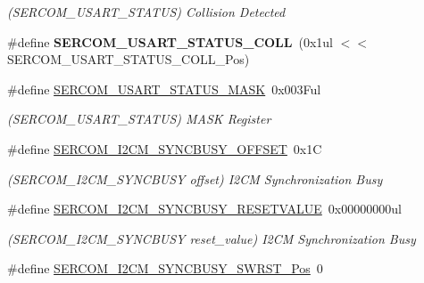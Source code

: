 \begin{DoxyCompactItemize}
\begin{DoxyCompactList}\small\item\em (S\+E\+R\+C\+O\+M\+\_\+\+U\+S\+A\+R\+T\+\_\+\+S\+T\+A\+T\+U\+S) Collision Detected \end{DoxyCompactList}\item 
\hypertarget{group___s_a_m_l21___s_e_r_c_o_m_gaa44fd322c8b2ce56480d8405b502d199}{}\#define {\bfseries S\+E\+R\+C\+O\+M\+\_\+\+U\+S\+A\+R\+T\+\_\+\+S\+T\+A\+T\+U\+S\+\_\+\+C\+O\+L\+L}~(0x1ul $<$$<$ S\+E\+R\+C\+O\+M\+\_\+\+U\+S\+A\+R\+T\+\_\+\+S\+T\+A\+T\+U\+S\+\_\+\+C\+O\+L\+L\+\_\+\+Pos)\label{group___s_a_m_l21___s_e_r_c_o_m_gaa44fd322c8b2ce56480d8405b502d199}

\item 
\hypertarget{group___s_a_m_l21___s_e_r_c_o_m_ga376a8d84d9e73841d02b5b1dd0e67373}{}\#define \hyperlink{group___s_a_m_l21___s_e_r_c_o_m_ga376a8d84d9e73841d02b5b1dd0e67373}{S\+E\+R\+C\+O\+M\+\_\+\+U\+S\+A\+R\+T\+\_\+\+S\+T\+A\+T\+U\+S\+\_\+\+M\+A\+S\+K}~0x003\+Ful\label{group___s_a_m_l21___s_e_r_c_o_m_ga376a8d84d9e73841d02b5b1dd0e67373}

\begin{DoxyCompactList}\small\item\em (S\+E\+R\+C\+O\+M\+\_\+\+U\+S\+A\+R\+T\+\_\+\+S\+T\+A\+T\+U\+S) M\+A\+S\+K Register \end{DoxyCompactList}\item 
\hypertarget{group___s_a_m_l21___s_e_r_c_o_m_ga75c9ff5051408410f3090673825096e8}{}\#define \hyperlink{group___s_a_m_l21___s_e_r_c_o_m_ga75c9ff5051408410f3090673825096e8}{S\+E\+R\+C\+O\+M\+\_\+\+I2\+C\+M\+\_\+\+S\+Y\+N\+C\+B\+U\+S\+Y\+\_\+\+O\+F\+F\+S\+E\+T}~0x1\+C\label{group___s_a_m_l21___s_e_r_c_o_m_ga75c9ff5051408410f3090673825096e8}

\begin{DoxyCompactList}\small\item\em (S\+E\+R\+C\+O\+M\+\_\+\+I2\+C\+M\+\_\+\+S\+Y\+N\+C\+B\+U\+S\+Y offset) I2\+C\+M Synchronization Busy \end{DoxyCompactList}\item 
\hypertarget{group___s_a_m_l21___s_e_r_c_o_m_ga0487853f514e4a49833f238ae762964f}{}\#define \hyperlink{group___s_a_m_l21___s_e_r_c_o_m_ga0487853f514e4a49833f238ae762964f}{S\+E\+R\+C\+O\+M\+\_\+\+I2\+C\+M\+\_\+\+S\+Y\+N\+C\+B\+U\+S\+Y\+\_\+\+R\+E\+S\+E\+T\+V\+A\+L\+U\+E}~0x00000000ul\label{group___s_a_m_l21___s_e_r_c_o_m_ga0487853f514e4a49833f238ae762964f}

\begin{DoxyCompactList}\small\item\em (S\+E\+R\+C\+O\+M\+\_\+\+I2\+C\+M\+\_\+\+S\+Y\+N\+C\+B\+U\+S\+Y reset\+\_\+value) I2\+C\+M Synchronization Busy \end{DoxyCompactList}\item 
\hypertarget{group___s_a_m_l21___s_e_r_c_o_m_ga6554714f373cdd011568c4db843fbbbc}{}\#define \hyperlink{group___s_a_m_l21___s_e_r_c_o_m_ga6554714f373cdd011568c4db843fbbbc}{S\+E\+R\+C\+O\+M\+\_\+\+I2\+C\+M\+\_\+\+S\+Y\+N\+C\+B\+U\+S\+Y\+\_\+\+S\+W\+R\+S\+T\+\_\+\+Pos}~0\label{group___s_a_m_l21___s_e_r_c_o_m_ga6554714f373cdd011568c4db843fbbbc}


\end{DoxyCompactItemize}
